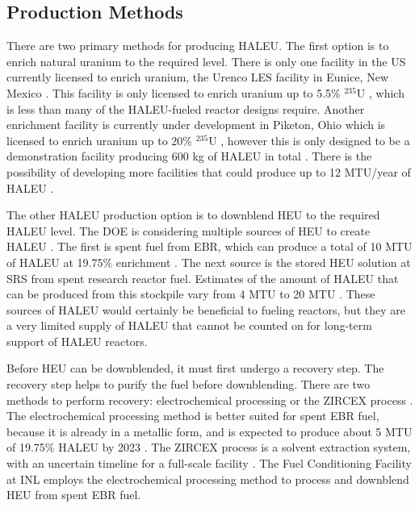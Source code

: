\subsection{Production Methods}
There are two primary methods for producing \gls{HALEU}. The first 
option is to enrich natural uranium to the required level. There is only one 
facility in the US currently 
licensed to enrich uranium, the Urenco LES facility in Eunice, 
New Mexico \cite{nuclear_energy_institute_establishing_2022}. This facility is only 
licensed to enrich uranium up to 5.5\% $^{235}$U 
\cite{nuclear_energy_institute_establishing_2022},
which is less than many of the \gls{HALEU}-fueled reactor designs 
require. Another enrichment facility is currently under development in 
Piketon, Ohio which is licensed to enrich uranium up to 20\% 
$^{235}$U \cite{nuclear_energy_institute_establishing_2022}, however this is only 
designed to be a demonstration facility producing 600 kg of 
\gls{HALEU} in total \cite{us_nuclear_regulatory_commission_centrus_2021}.
There is the possibility of developing more facilities that could produce up 
to 12 MTU/year of \gls{HALEU} \cite{nuclear_energy_institute_establishing_2022}.

The other \gls{HALEU} production option is to downblend \gls{HEU} to 
the required \gls{HALEU}
level. The \gls{DOE} is considering multiple sources of \gls{HEU} 
to create \gls{HALEU} \cite{nuclear_energy_institute_establishing_2022}. The 
first is spent fuel from \gls{EBR}, which can produce a total of 10 MTU 
of \gls{HALEU} at 19.75\% enrichment \cite{nuclear_energy_institute_establishing_2022}. 
The next source is the stored \gls{HEU} solution at \gls{SRS} from 
spent research reactor fuel. Estimates of the amount of \gls{HALEU}
that can be produced from this stockpile vary from 4 MTU 
\cite{nuclear_energy_institute_establishing_2022} to 20 MTU \cite{regalbuto_addressing_2020}.
These sources of 
\gls{HALEU} would certainly be beneficial to fueling reactors, but they 
are a very limited supply of \gls{HALEU} that cannot be counted on 
for long-term support of \gls{HALEU} reactors.

Before \gls{HEU} can be downblended, it must first undergo a recovery step. 
The recovery step helps to purify the fuel before downblending. There 
are two methods to perform recovery: electrochemical processing or 
the ZIRCEX process \cite{herczeg_high-assay_2019}. The electrochemical 
processing method is better suited for spent \gls{EBR} fuel, because it is 
already in a metallic form, and is expected to produce about 5 MTU of 
19.75\% \gls{HALEU} by 2023 \cite{herczeg_high-assay_2019}. The ZIRCEX 
process is a solvent extraction system, with an uncertain timeline 
for a full-scale facility \cite{herczeg_high-assay_2019}. The 
Fuel Conditioning Facility at \gls{INL} employs the electrochemical 
processing method to process and downblend \gls{HEU} from spent 
\gls{EBR} fuel. 

